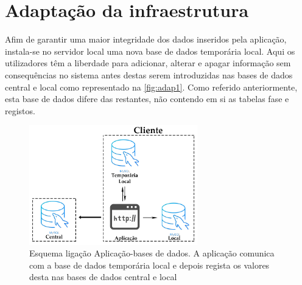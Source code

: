 \documentclass[11pt,twoside,a4paper]{report}
\begin{document}
\section{Adaptação da infraestrutura}
Afim de garantir uma maior integridade dos dados inseridos pela aplicação, instala-se no servidor local uma nova base de dados temporária local. Aqui os utilizadores têm a liberdade para adicionar, alterar e apagar informação sem consequências no sistema antes destas serem introduzidas nas bases de dados central e local como representado na \autoref{fig:adap1}. Como referido anteriormente, esta base de dados difere das restantes, não contendo em si as tabelas fase e registos.
\begin{figure}[H]
	\begin{center}
		\includegraphics[width=0.65\textwidth]{Aplicacao_temp_local_central} %
		\caption{Esquema ligação Aplicação-bases de dados. A aplicação comunica com a base de dados temporária local e depois regista os valores desta nas bases de dados central e local}
		\label{fig:adap1}
	\end{center}
\end{figure}
\end{document}
